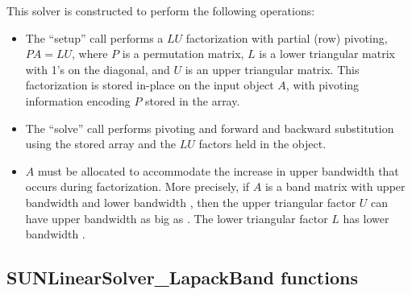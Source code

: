 This solver is constructed to perform the following operations:
\begin{itemize}
\item The ``setup'' call performs a $LU$ factorization with
  partial (row) pivoting, $PA=LU$, where $P$ is a permutation matrix,
  $L$ is a lower triangular matrix with 1's on the diagonal, and $U$
  is an upper triangular matrix.  This factorization is stored
  in-place on the input {\sunmatband} object $A$, with pivoting
  information encoding $P$ stored in the  array.
\item The ``solve'' call performs pivoting and forward and
  backward substitution using the stored  array and the
  $LU$ factors held in the {\sunmatband} object.
\item
  $A$ must be allocated to accommodate the increase in upper
  bandwidth that occurs during factorization.  More precisely, if $A$
  is a band matrix with upper bandwidth  and lower bandwidth
  , then the upper triangular factor $U$ can have upper
  bandwidth as big as . The lower triangular
  factor $L$ has lower bandwidth . {\warn}
\end{itemize}


\subsection{SUNLinearSolver\_LapackBand functions}
\label{ss:sunlinsol_lapband_functions}

